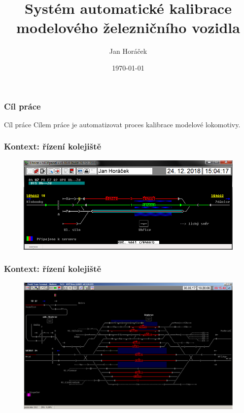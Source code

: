 \documentclass[aspectratio=169]{beamer}
\title[Automatická kalibrace]{Systém automatické kalibrace modelového
železničního vozidla}
\author{Jan Horáček}
\institute[FI MUNI]{
	Fakulta informatiky \\
	Masarykova univerzita \\
	\medskip
	\textit{horacekj@mail.muni.cz}
}
\date{\today}
\begin{document}

\begin{frame}
\titlepage
\end{frame}


\begin{frame}
\frametitle{Cíl práce}
\begin{block}{Cíl práce}
Cílem práce je automatizovat proces kalibrace modelové lokomotivy.
\end{block}
\end{frame}


\begin{frame}
\frametitle{Kontext: řízení kolejiště}
\begin{figure}
\includegraphics[width=0.7\columnwidth]{data/hJOPpanel-uh.png}
\end{figure}
\end{frame}


\begin{frame}
\frametitle{Kontext: řízení kolejiště}
\begin{figure}
\includegraphics[width=0.75\columnwidth]{data/JOP2-SkLogin.png}
\end{figure}
\end{frame}
\end{document}

